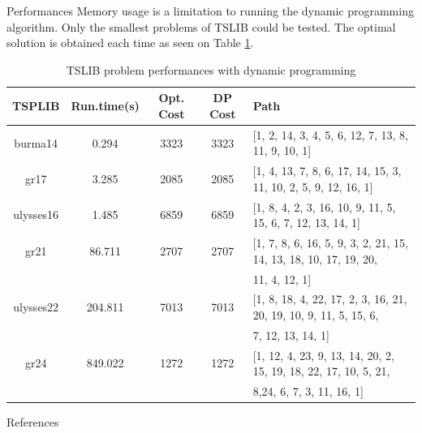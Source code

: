 \documentclass[../report.tex]{subfiles}
\begin{document}
\begin{subsection}{Performances}
Memory usage is a limitation to running the dynamic programming algorithm. Only the smallest problems of TSLIB could be tested. The optimal solution is obtained each time as seen on Table \ref{table:dpt1}.

\begin{table}[!h]
\centering
\footnotesize
\begin{tabular}{||c||c|c|c|l||}
\hline
\hline
\bf TSPLIB & \bf Run.time(s) & \bf Opt. Cost & \bf DP Cost & \bf Path \\
\hline
\hline
burma14 & 0.294 & 3323 & 3323 & [1, 2, 14, 3, 4, 5, 6, 12, 7, 13, 8, 11, 9, 10, 1]\\
gr17	& 3.285 & 2085 & 2085 &  [1, 4, 13, 7, 8, 6, 17, 14, 15, 3, 11, 10, 2, 5, 9, 12, 16, 1] \\
ulysses16 & 1.485	 & 6859 & 6859 & [1, 8, 4, 2, 3, 16, 10, 9, 11, 5, 15, 6, 7, 12, 13, 14, 1] \\
gr21& 86.711 & 2707 & 2707 &	[1, 7, 8, 6, 16, 5, 9, 3, 2, 21, 15, 14, 13, 18, 10, 17, 19, 20, \\
 & & & &   11, 4, 12, 1] \\
ulysses22 & 204.811 &	7013 & 7013 & [1, 8, 18, 4, 22, 17, 2, 3, 16, 21, 20, 19, 10, 9, 11, 5, 15, 6,\\
 & & & &    7, 12, 13, 14, 1]\\
gr24	& 849.022 & 1272 & 1272 &	[1, 12, 4, 23, 9, 13, 14, 20, 2, 15, 19, 18, 22, 17, 10, 5, 21, \\
 & & & &  8,24, 6, 7, 3, 11, 16, 1]   \\
\hline
\hline
\end{tabular}
\caption{TSLIB problem performances with dynamic programming}
\label{table:dpt1}
\end{table}

\end{subsection}

\begin{subsection}{References}



\end{subsection}
\end{document}
